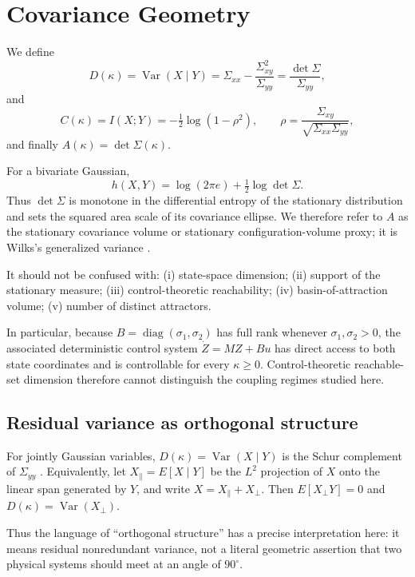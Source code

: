 \documentclass[11pt]{article}
\theoremstyle{plain}
\theoremstyle{remark}
\newcommand{\Var}{\operatorname{Var}}
\newcommand{\I}{I}
\begin{document}
\section{Covariance Geometry}

We define
\begin{equation}
  D(\kappa)=\Var(X\mid Y)=\Sigma_{xx}-\frac{\Sigma_{xy}^2}{\Sigma_{yy}}
  =\frac{\det\Sigma}{\Sigma_{yy}}, \label{eq:Ddef}
\end{equation}
and
\begin{equation}
  C(\kappa)=\I(X;Y)=-\tfrac12\log\!\left(1-\rho^2\right),
  \qquad
  \rho=\frac{\Sigma_{xy}}{\sqrt{\Sigma_{xx}\Sigma_{yy}}}, \label{eq:Cdef}
\end{equation}
and finally $A(\kappa)=\det\Sigma(\kappa)$.

For a bivariate Gaussian,
\[
  h(X,Y)=\log(2\pi e)+\tfrac12\log\det\Sigma .
\]
Thus $\det\Sigma$ is monotone in the differential entropy of the stationary distribution and
sets the squared area scale of its covariance ellipse. We therefore refer to $A$ as the
stationary covariance volume or stationary configuration-volume proxy; it is Wilks's
generalized variance \cite{Wilks1932}.

It should not be confused with: (i) state-space dimension; (ii) support of the stationary
measure; (iii) control-theoretic reachability; (iv) basin-of-attraction volume; (v) number of
distinct attractors.

In particular, because $B=\operatorname{diag}(\sigma_1,\sigma_2)$ has full rank whenever
$\sigma_1,\sigma_2>0$, the associated deterministic control system $\dot Z=MZ+Bu$ has direct
access to both state coordinates and is controllable for every $\kappa\ge0$. Control-theoretic
reachable-set dimension therefore cannot distinguish the coupling regimes studied here.

\subsection{Residual variance as orthogonal structure}

For jointly Gaussian variables, $D(\kappa)=\Var(X\mid Y)$ is the Schur complement of
$\Sigma_{yy}$ \cite{Lauritzen1996,HornJohnson2012}. Equivalently, let $X_{\parallel}=E[X\mid Y]$
be the $L^2$ projection of $X$ onto the linear span generated by $Y$, and write
$X=X_{\parallel}+X_{\perp}$. Then $E[X_{\perp}Y]=0$ and $D(\kappa)=\Var(X_{\perp})$.

Thus the language of ``orthogonal structure'' has a precise interpretation here: it means
residual nonredundant variance, not a literal geometric assertion that two physical systems
should meet at an angle of $90^{\circ}$.
\end{document}
